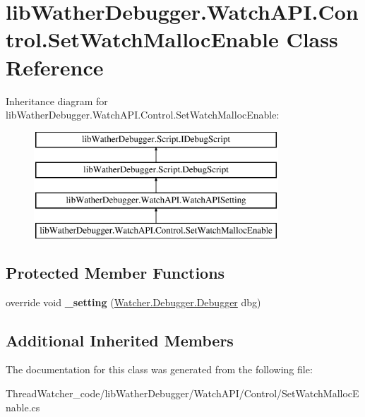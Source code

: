 \hypertarget{classlib_wather_debugger_1_1_watch_a_p_i_1_1_control_1_1_set_watch_malloc_enable}{\section{lib\+Wather\+Debugger.\+Watch\+A\+P\+I.\+Control.\+Set\+Watch\+Malloc\+Enable Class Reference}
\label{classlib_wather_debugger_1_1_watch_a_p_i_1_1_control_1_1_set_watch_malloc_enable}
}
Inheritance diagram for lib\+Wather\+Debugger.\+Watch\+A\+P\+I.\+Control.\+Set\+Watch\+Malloc\+Enable\+:\begin{figure}[H]
\begin{center}
\leavevmode
\includegraphics[height=4.000000cm]{classlib_wather_debugger_1_1_watch_a_p_i_1_1_control_1_1_set_watch_malloc_enable}
\end{center}
\end{figure}
\subsection*{Protected Member Functions}
\begin{DoxyCompactItemize}
\item 
\hypertarget{classlib_wather_debugger_1_1_watch_a_p_i_1_1_control_1_1_set_watch_malloc_enable_acd0032de28c14965367a831165ca29b9}{override void {\bfseries \+\_\+setting} (\hyperlink{class_watcher_1_1_debugger_1_1_debugger}{Watcher.\+Debugger.\+Debugger} dbg)}\label{classlib_wather_debugger_1_1_watch_a_p_i_1_1_control_1_1_set_watch_malloc_enable_acd0032de28c14965367a831165ca29b9}

\end{DoxyCompactItemize}
\subsection*{Additional Inherited Members}


The documentation for this class was generated from the following file\+:\begin{DoxyCompactItemize}
\item 
Thread\+Watcher\+\_\+code/lib\+Wather\+Debugger/\+Watch\+A\+P\+I/\+Control/Set\+Watch\+Malloc\+Enable.\+cs\end{DoxyCompactItemize}

